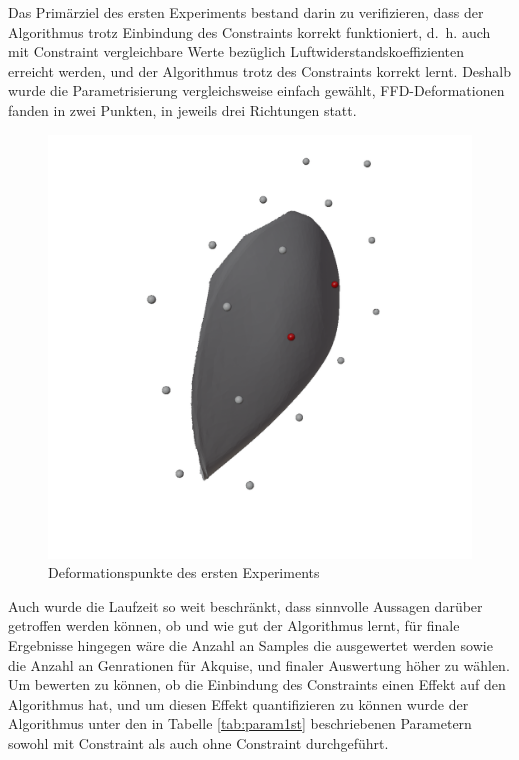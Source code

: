 Das Primärziel des ersten Experiments bestand darin zu verifizieren, dass der Algorithmus trotz Einbindung des Constraints korrekt funktioniert, d.~h. auch mit Constraint vergleichbare Werte bezüglich Luftwiderstandskoeffizienten erreicht werden, und der Algorithmus trotz des Constraints korrekt lernt.
Deshalb wurde die Parametrisierung vergleichsweise einfach gewählt, FFD-Deformationen fanden in zwei Punkten, in jeweils drei Richtungen statt.
\begin{figure}[h]
	\centering
	\includegraphics[width=.7\linewidth]{bilder/2ptDeformationPoints}
	\caption{Deformationspunkte des ersten Experiments}
	\label{fig:ffd1st}
\end{figure}
Auch wurde die Laufzeit so weit beschränkt, dass sinnvolle Aussagen darüber getroffen werden können, ob und wie gut der Algorithmus lernt, für finale Ergebnisse hingegen wäre die Anzahl an Samples die ausgewertet werden sowie die Anzahl an Genrationen für Akquise, und finaler Auswertung höher zu wählen.
Um bewerten zu können, ob die Einbindung des Constraints einen Effekt auf den Algorithmus hat, und um diesen Effekt quantifizieren zu können wurde der Algorithmus unter den in Tabelle \cref{tab:param1st} beschriebenen Parametern sowohl mit Constraint als auch ohne Constraint durchgeführt. 
